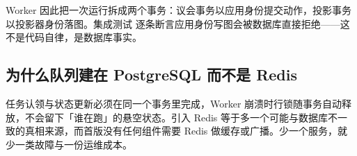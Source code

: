 Worker 因此把一次运行拆成两个事务：议会事务以应用身份提交动作，投影事务以投影器身份落图。集成测试  逐条断言应用身份写图会被数据库直接拒绝——这不是代码自律，是数据库事实。

\subsection{为什么队列建在 PostgreSQL 而不是 Redis}

任务认领与状态更新必须在同一个事务里完成，Worker 崩溃时行锁随事务自动释放，不会留下「谁在跑」的悬空状态。引入 Redis 等于多一个可能与数据库不一致的真相来源，而首版没有任何组件需要 Redis 做缓存或广播。少一个服务，就少一类故障与一份运维成本。
